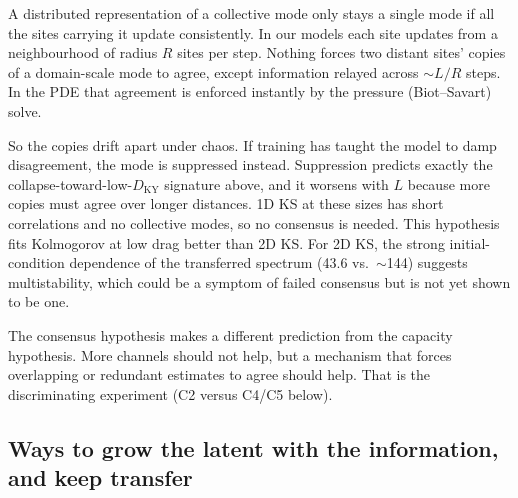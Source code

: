 \documentclass[11pt]{article}
\begin{document}
A distributed representation of a collective mode only stays a single
mode if all the sites carrying it update consistently. In our models each
site updates from a neighbourhood of radius $R$ sites per step. Nothing
forces two distant sites' copies of a domain-scale mode to agree, except
information relayed across $\sim L/R$ steps. In the PDE that agreement is
enforced instantly by the pressure (Biot--Savart) solve.

So the copies drift apart under chaos. If training has taught the model
to damp disagreement, the mode is suppressed instead. Suppression predicts
exactly the collapse-toward-low-$D_{\mathrm{KY}}$ signature above, and it
worsens with $L$ because more copies must agree over longer distances. 1D
KS at these sizes has short correlations and no collective modes, so no
consensus is needed. This hypothesis fits Kolmogorov at low drag better
than 2D KS. For 2D KS, the strong initial-condition dependence of the
transferred spectrum (43.6 vs.\ $\sim$144) suggests multistability, which
could be a symptom of failed consensus but is not yet shown to be one.

The consensus hypothesis makes a different prediction from the capacity
hypothesis. More channels should not help, but a mechanism that forces
overlapping or redundant estimates to agree should help. That is the
discriminating experiment (C2 versus C4/C5 below).

\subsection{Ways to grow the latent with the information, and keep transfer}
\end{document}
